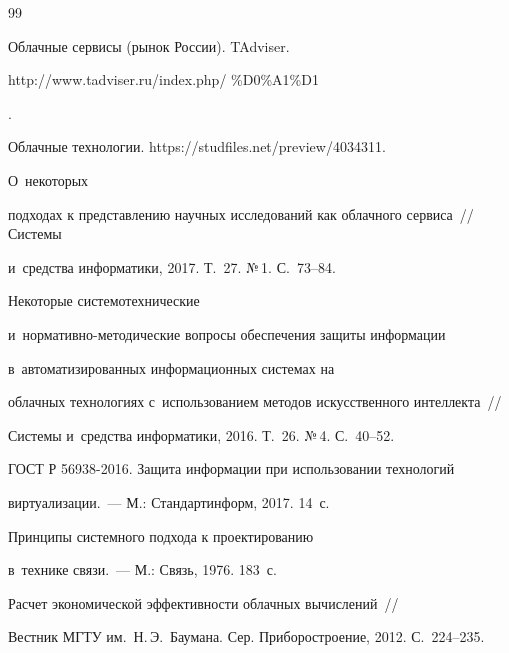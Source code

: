 {\small\frenchspacing

{%


\begin{thebibliography}{99}


  Облачные сервисы (рынок России). TAdviser. {\sf 

http://www.tadviser.ru/index.php/ \%D0\%A1\%D1}. 


  Облачные технологии. {\sf https://studfiles.net/preview/4034311}. 


   О~некоторых 

подходах к представлению научных исследований как облачного сервиса~/\!\!/ Системы 

и~средства информатики, 2017. Т.~27. №\,1. С.~73--84. 


   Некоторые системотехнические  

и~нор\-ма\-тив\-но-ме\-то\-ди\-че\-ские вопросы обеспечения защиты информации 

в~автоматизированных информационных сис\-те\-мах на 

облачных технологиях с~использованием методов искусственного интеллекта~/\!\!/ 

Системы и~средства информатики, 2016. Т.~26. №\,4. С.~40--52.


  ГОСТ Р 56938-2016. Защита информации при использовании технологий  

виртуализации.~--- М.: Стандартинформ, 2017. 14~с.


   Принципы системного подхода к проектированию 

  в~технике связи.~--- М.: Связь, 1976. 183~с.


    Расчет экономической эффективности облачных вычислений~/\!\!/ 

Вестник МГТУ им.\ Н.\,Э.~Баумана. Сер. Приборостроение, 2012. С.~224--235.



\end{thebibliography}}}
